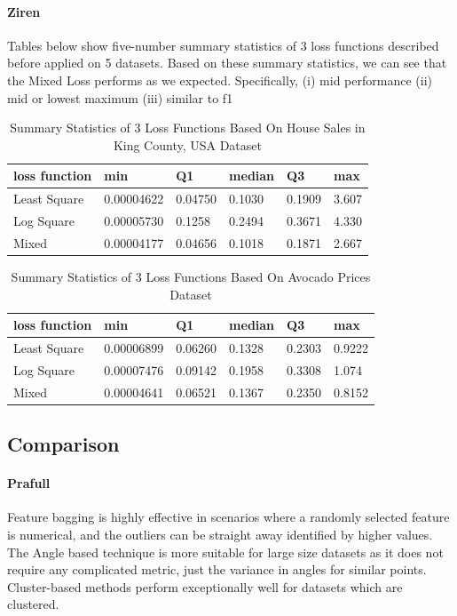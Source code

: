 \documentclass[runningheads]{llncs}
\begin{document}
\paragraph{Ziren}Tables below show five-number summary statistics of 3 loss functions described before applied on 5 datasets. Based on these summary statistics, we can see that the Mixed Loss performs as we expected. Specifically, (i) mid performance (ii) mid or lowest maximum (iii) similar to f1
\begin{table}[h]
\begin{center}
\begin{tabular}{|l|l|l|l|l|l|}
\hline
loss function & min & Q1 & median & Q3 & max \\ \hline
Least Square & 0.00004622 & 0.04750 & 0.1030 & 0.1909 & 3.607 \\ \hline
Log Square & 0.00005730 & 0.1258 & 0.2494 & 0.3671 & 4.330 \\ \hline
Mixed & 0.00004177 & 0.04656 & 0.1018 & 0.1871 & 2.667 \\ \hline
\end{tabular}
\end{center}
\caption{Summary Statistics of 3 Loss Functions Based On House Sales in King County, USA Dataset}\label{summary-statistics-3-functions-k3}
\end{table}
\begin{table}[h]
\begin{center}
\begin{tabular}{|l|l|l|l|l|l|}
\hline
loss function & min & Q1 & median & Q3 & max \\ \hline
Least Square & 0.00006899 & 0.06260 & 0.1328 & 0.2303 & 0.9222 \\ \hline
Log Square & 0.00007476 & 0.09142 & 0.1958 & 0.3308 & 1.074 \\ \hline
Mixed & 0.00004641 & 0.06521 & 0.1367 & 0.2350 & 0.8152 \\ \hline
\end{tabular}
\end{center}
\caption{Summary Statistics of 3 Loss Functions Based On Avocado Prices Dataset}\label{summary-statistics-3-functions-k1}
\end{table}


\subsection{Comparison}
\paragraph{Prafull} Feature bagging is highly effective in scenarios where a randomly selected feature is numerical, and the outliers can be straight away identified by higher values. The Angle based technique is more suitable for large size datasets as it does not require any complicated metric, just the variance in angles for similar points. Cluster-based methods perform exceptionally well for datasets which are clustered.
\end{document}
